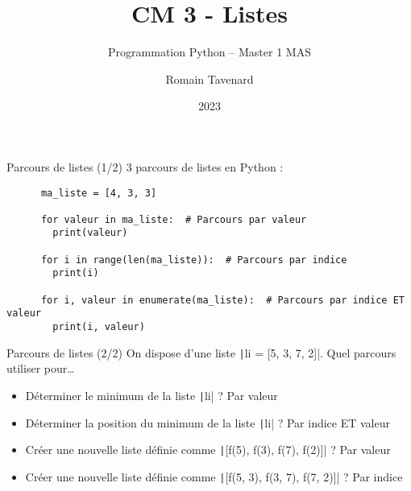 \documentclass[10pt]{beamer}
\title[M1 MAS -- Python -- Listes]{CM 3 - Listes}
\subtitle{Programmation Python -- Master 1 MAS}
\author{Romain Tavenard}
\date{2023}
\institute{%
\hypersetup{urlcolor=.}
\makebox[2.2ex][c]{\faEnvelope}\enspace\href{mailto:romain.tavenard@univ-rennes2.fr}{\texttt{romain.tavenard@univ-rennes2.fr}}\\%
}
\begin{document}
\maketitle


\begin{frame}[fragile]{Parcours de listes (1/2)}  
  3 parcours de listes en Python :

  \begin{beamercodeblock}
    \begin{verbatim}
      ma_liste = [4, 3, 3]

      for valeur in ma_liste:  # Parcours par valeur
        print(valeur)
      
      for i in range(len(ma_liste)):  # Parcours par indice
        print(i)
      
      for i, valeur in enumerate(ma_liste):  # Parcours par indice ET valeur
        print(i, valeur)
    \end{verbatim}
  \end{beamercodeblock}
\end{frame}

\begin{frame}[fragile]{Parcours de listes (2/2)}  
  On dispose d'une liste \texttt|li = [5, 3, 7, 2]|.
  Quel parcours utiliser pour\dots

  \begin{itemize}
    \item Déterminer le minimum de la liste \texttt|li| ? \pause \alert{Par valeur}
    \item Déterminer la position du minimum de la liste \texttt|li| ? \pause \alert{Par indice ET valeur}
    \item Créer une nouvelle liste définie comme \texttt|[f(5), f(3), f(7), f(2)]| ? \pause \alert{Par valeur}
    \item Créer une nouvelle liste définie comme \texttt|[f(5, 3), f(3, 7), f(7, 2)]| ? \pause \alert{Par indice}
  \end{itemize}
\end{frame}
\end{document}
